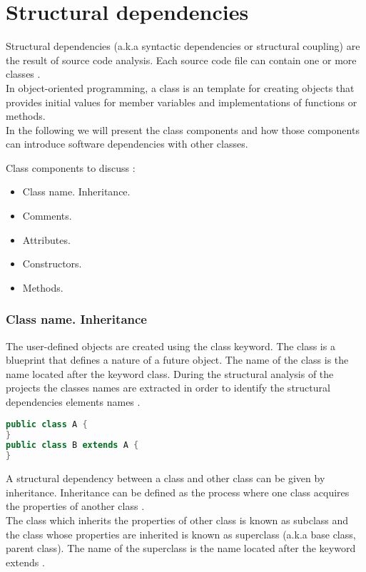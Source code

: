 \section{Structural dependencies}
\tab Structural dependencies (a.k.a syntactic dependencies or structural coupling) are the result of source code analysis. Each source code ﬁle can contain one or more classes \cite{ct4}.\\

In object-oriented programming, a class is an template for creating objects that provides initial values for member variables and implementations of functions or methods. \cite{oopconcept}\\
\tab In the following we will present the class components and how those components can introduce software dependencies with other classes.

Class components to discuss :
\begin{itemize}
  \item Class name. Inheritance.
  \item Comments.
  \item Attributes. 
   \item Constructors.
   \item Methods.
\end{itemize}


\subsubsection{Class name. Inheritance}
The user-defined objects are created using the class keyword. The class is a blueprint that defines a nature of a future object. 
The name of the class is the name located after the keyword class. During the structural analysis of the projects the classes names are extracted in order to identify the structural dependencies elements names .

\begin{lstlisting}[language=java, caption={Class declaration.}]
public class A {
}
public class B extends A {
}
\end{lstlisting}

A structural dependency between a class and other class can be given by inheritance. Inheritance can be defined as the process where one class acquires the properties of another class \cite{oopconcept} .\\
The class which inherits the properties of other class is known as subclass and the class whose properties are inherited is known as superclass (a.k.a base class, parent class). The name of the superclass is the name located after the keyword extends .


